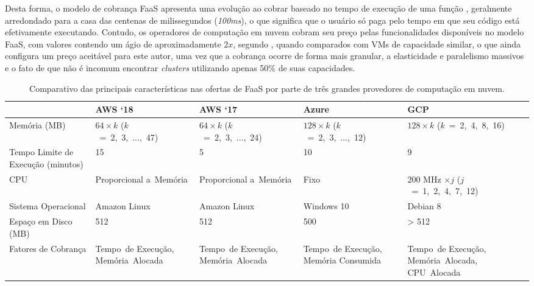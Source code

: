 \documentclass[english,brazilian]{UNISINOSmonografia} %
\renewcommand{\arraystretch}{1.3}
\begin{document}
Desta forma, o modelo de cobrança FaaS apresenta uma evolução  ao cobrar baseado no tempo de execução de uma função \cite{FowlerServerless, Wang2018}, geralmente arredondado para a casa das centenas de milissegundos (\textit{100ms}), o que significa que o usuário só paga pelo tempo em que seu código está efetivamente executando.
Contudo, os operadores de computação em nuvem cobram seu preço pelas funcionalidades disponíveis no modelo FaaS, com valores contendo um ágio de aproximadamente $2x$, segundo , quando comparados com VMs de capacidade similar, o que ainda configura um preço aceitável para este autor, uma vez que a cobrança ocorre de forma mais granular, a elasticidade e paralelismo massivos e o fato de que não é incomum encontrar \textit{clusters} utilizando apenas 50\% de suas capacidades.



\begin{table}[tbp]
	\centering%
	\begin{minipage}{\textwidth}
		\caption{Comparativo das principais características nas ofertas de FaaS por parte de três grandes provedores de computação em nuvem.}
		\label{tab:FaaS-implementations}
		\vspace{1ex}
		\renewcommand\arraystretch{1.4}
		\renewcommand {\tabularxcolumn}[1]{>{\arraybackslash}m{#1}}
		\begin{tabularx}{\textwidth}{@{}WYYYY@{}}
			\toprule
			& {AWS \textquoteleft18} & {AWS \textquoteleft17} & {Azure} & {GCP} \\ 
			\midrule
			{Memória (MB)} & $ 64 \times k $ ($k$~=~2,~3,~...,~47) & $ 64 \times k $ ($k$~=~2,~3,~...,~24) & $ 128 \times k $ ($k$~=~2,~3,~...,~12) & $ 128 \times k $ ($k$~=~2,~4,~8,~16) \\
			{Tempo Limite de Execução (minutos)} & 15 & 5 & 10 & 9 \\
			{CPU} & Proporcional a~Memória & Proporcional a~Memória & Fixo & $ 200 $ MHz $ \times j $ ($j$~=~1,~2,~4,~7,~12) \\
			{Sistema Operacional} & Amazon Linux & Amazon Linux & Windows 10 & Debian 8 \\
			{Espaço em Disco (MB)} & 512 & 512 & 500 & > 512 \\
			{Fatores de Cobrança} & {\footnotesize Tempo~de Execução, Memória~Alocada} & {\footnotesize Tempo~de Execução, Memória~Alocada} & {\footnotesize Tempo~de Execução, Memória Consumida} & {\footnotesize Tempo~de Execução, Memória~Alocada, CPU~Alocada} \\ 
			\bottomrule	\end{tabularx}
	\end{minipage}
\end{table}
\end{document}
